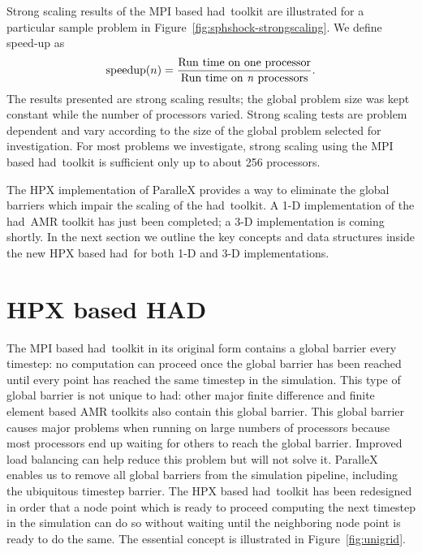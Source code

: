 \documentclass[prd,aps,showpacs,nofootinbib,floats,floatfix,twocolumn,letterpaper]{revtex4}
\newcommand{\had}{{\sc had}}
\begin{document}
Strong scaling results of the MPI based \had\ toolkit are illustrated for a particular sample problem
in Figure~\ref{fig:sphshock-strongscaling}.  We define speed-up as  
\begin{eqnarray*}
{\rm speedup}(n) = \frac{{\rm Run~time~on~one~processor}}{{\rm Run~time~on~{\it n}~processors}}.
\end{eqnarray*}
The results presented are 
strong scaling results; the global problem size was kept constant while the
number of processors varied.  Strong scaling tests are problem dependent and vary
according to the size of the global problem selected for investigation.  For most problems
we investigate, strong scaling using the MPI based \had\ toolkit is sufficient only up to about 256 processors.

The HPX implementation of ParalleX provides a way to eliminate the global barriers which 
impair the scaling of the \had\ toolkit.   A 1-D implementation of the \had\ AMR toolkit has
just been completed; a 3-D implementation is coming shortly.  In the next section we 
outline the key concepts and data structures inside the new HPX based \had\ 
for both 1-D and 3-D implementations.

\vspace{0.4cm}
%
%
\section{HPX based HAD}
\label{sec:hpx_had}

The MPI based \had\ toolkit in its original form contains a global barrier every timestep: no
computation can proceed once the global barrier has been reached until every point has reached
the same timestep in the simulation.  This type of global barrier is not unique to \had: other
major finite difference and finite element based AMR toolkits also contain this global barrier.
This global barrier causes major problems when running on large numbers of processors because
most processors end up waiting for others to reach the global barrier.  Improved load balancing
can help reduce this problem but will not solve it.  ParalleX enables us to remove all 
global barriers from the simulation pipeline, including the ubiquitous timestep barrier.  The
HPX based \had\ toolkit has been redesigned in order that a node point which is ready to proceed 
computing the next
timestep in the simulation can do so without waiting until the neighboring node point is ready to do the same. 
The essential concept is illustrated in Figure~\ref{fig:unigrid}.
\end{document}
